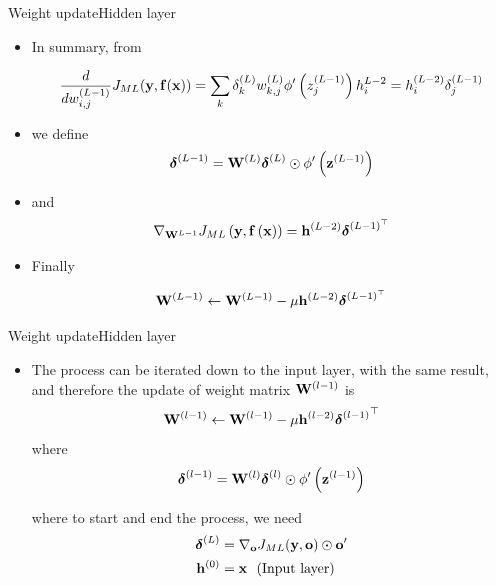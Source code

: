 \documentclass{beamer}
\begin{document}
\begin{frame}{Weight update}{Hidden layer}
    \begin{itemize}
        \item In summary, from 

\begin{equation}\nonumber 
    \frac{d}{dw_{i,j}^{(L-1)}}   J_{ML}({\bf y},{\bf f}({\bf x})) =\sum_{k}
    \delta_k^{(L)}w_{k,j}^{(L)}\phi'\left(z^{(L-1)}_j\right)
    h^{L-2}_i=h^{(L-2)}_i\delta_j^{(L-1)}
\end{equation}
\item we define 
        \begin{equation}
    {\boldsymbol \delta}^{(L-1)} = {\bf W}^ {(L)}{\boldsymbol \delta}^{(L)}\odot \phi'\left({\bf z}^{(L-1)}\right)
\end{equation}
\item  and 
\begin{equation}
 \nabla_{{\bf W}^{L-1}}J_{ML}\left({\bf y},{\bf f}\left({\bf x}\right)\right)={{\bf h}^{(L-2)}} {\boldsymbol \delta}^{(L-1)^\top} 
\end{equation}


\item Finally

\begin{equation}
    {\bf W}^{(L-1)} \leftarrow     {\bf W}^{(L-1)}  - \mu  {{\bf h}^{(L-2)}} {\boldsymbol \delta}^{(L-1)^\top}
\end{equation}  
\end{itemize}
\end{frame}

\begin{frame}{Weight update}{Hidden layer}
    \begin{itemize}
        \item The process can be iterated down to the input layer, with the same result, and therefore the update of weight matrix ${\bf W}^{(l-1)}$ is 
\begin{equation}\label{eq:bp_update}
    {\bf W}^{(l-1)} \leftarrow {\bf W}^{(l-1)} - \mu   {{\bf h}^{(l-2)}} {{\boldsymbol \delta}^{(l-1)}}^\top
\end{equation}
where
\begin{equation}\label{eq:general_error_term}
    {\boldsymbol \delta}^{(l-1)} = {\bf W}^ {(l)}{\boldsymbol \delta}^{(l)}\odot
    \phi'\left({\bf z}^{(l-1)}\right)
\end{equation}

where to start and end the process, we need
\begin{equation}
\begin{split}
{\boldsymbol \delta}^{(L)} & = \nabla_{{\bf o}}J_{ML}({\bf y},{\bf o}) \odot {\bf o}'\\
{\bf h}^{(0)}&={\bf x}  ~~\text{(Input layer)}
\end{split}
\end{equation}
\end{itemize}
\end{frame}
\end{document}
